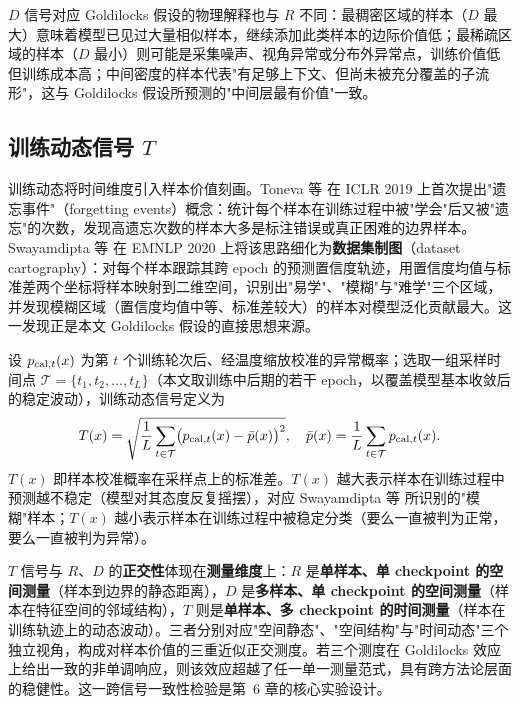 \documentclass[UTF8,openany,12pt]{ctexbook}
\begin{document}
$D$ 信号对应 Goldilocks 假设的物理解释也与 $R$ 不同：最稠密区域的样本（$D$ 最大）意味着模型已见过大量相似样本，继续添加此类样本的边际价值低；最稀疏区域的样本（$D$ 最小）则可能是采集噪声、视角异常或分布外异常点，训练价值低但训练成本高；中间密度的样本代表"有足够上下文、但尚未被充分覆盖的子流形"，这与 Goldilocks 假设所预测的"中间层最有价值"一致。

\subsection{训练动态信号 $T$}
训练动态将时间维度引入样本价值刻画。Toneva 等\cite{toneva2019empirical} 在 ICLR 2019 上首次提出"遗忘事件"（forgetting events）概念：统计每个样本在训练过程中被"学会"后又被"遗忘"的次数，发现高遗忘次数的样本大多是标注错误或真正困难的边界样本。Swayamdipta 等\cite{swayamdipta2020cartography} 在 EMNLP 2020 上将该思路细化为\textbf{数据集制图}（dataset cartography）：对每个样本跟踪其跨 epoch 的预测置信度轨迹，用置信度均值与标准差两个坐标将样本映射到二维空间，识别出"易学"、"模糊"与"难学"三个区域，并发现模糊区域（置信度均值中等、标准差较大）的样本对模型泛化贡献最大。这一发现正是本文 Goldilocks 假设的直接思想来源。

设 $p_{{\rm cal},t}(x)$ 为第 $t$ 个训练轮次后、经温度缩放校准的异常概率；选取一组采样时间点 $\mathcal{T} = \{t_1, t_2, \ldots, t_L\}$（本文取训练中后期的若干 epoch，以覆盖模型基本收敛后的稳定波动），训练动态信号定义为
\begin{equation}
T(x) = \sqrt{\frac{1}{L}\sum_{t \in \mathcal{T}}\bigl(p_{{\rm cal},t}(x) - \bar{p}(x)\bigr)^2}, \quad \bar{p}(x) = \frac{1}{L}\sum_{t \in \mathcal{T}} p_{{\rm cal},t}(x).
\label{eq:signal-T}
\end{equation}
$T(x)$ 即样本校准概率在采样点上的标准差。$T(x)$ 越大表示样本在训练过程中预测越不稳定（模型对其态度反复摇摆），对应 Swayamdipta 等\cite{swayamdipta2020cartography} 所识别的"模糊"样本；$T(x)$ 越小表示样本在训练过程中被稳定分类（要么一直被判为正常，要么一直被判为异常）。

$T$ 信号与 $R$、$D$ 的\textbf{正交性}体现在\textbf{测量维度}上：$R$ 是\textbf{单样本、单 checkpoint 的空间测量}（样本到边界的静态距离），$D$ 是\textbf{多样本、单 checkpoint 的空间测量}（样本在特征空间的邻域结构），$T$ 则是\textbf{单样本、多 checkpoint 的时间测量}（样本在训练轨迹上的动态波动）。三者分别对应"空间静态"、"空间结构"与"时间动态"三个独立视角，构成对样本价值的三重近似正交测度。若三个测度在 Goldilocks 效应上给出一致的非单调响应，则该效应超越了任一单一测量范式，具有跨方法论层面的稳健性。这一跨信号一致性检验是第~6 章的核心实验设计。
\end{document}
